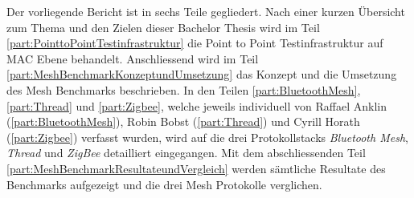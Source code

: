 Der vorliegende Bericht ist in sechs Teile gegliedert.
Nach einer kurzen Übersicht zum Thema und den Zielen dieser Bachelor Thesis wird im Teil \ref{part:PointtoPointTestinfrastruktur} die Point to Point Testinfrastruktur auf MAC Ebene behandelt.
Anschliessend wird im Teil \ref{part:MeshBenchmarkKonzeptundUmsetzung} das Konzept und die Umsetzung des Mesh Benchmarks beschrieben.
In den Teilen \ref{part:BluetoothMesh}, \ref{part:Thread} und \ref{part:Zigbee}, welche jeweils individuell von Raffael Anklin (\ref{part:BluetoothMesh}), Robin Bobst (\ref{part:Thread}) und Cyrill Horath (\ref{part:Zigbee}) verfasst wurden, wird auf die drei Protokollstacks \textit{Bluetooth Mesh}, \textit{Thread} und \textit{ZigBee} detailliert eingegangen.
Mit dem abschliessenden Teil \ref{part:MeshBenchmarkResultateundVergleich} werden sämtliche Resultate des Benchmarks aufgezeigt und die drei Mesh Protokolle verglichen.

